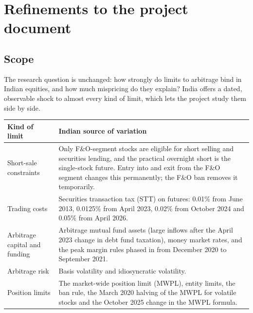 \documentclass[11pt,a4paper]{article}
\begin{document}
\section{Refinements to the project document}\label{sec:refine}
\subsection{Scope}
The research question is unchanged: how strongly do limits to arbitrage bind in Indian equities, and how much mispricing do
they explain? India offers a dated, observable shock to almost every kind of limit, which lets the project study them side by
side.

\begin{center}\small
\begin{tabularx}{\textwidth}{>{\raggedright\arraybackslash}p{3.3cm}>{\raggedright\arraybackslash}X}
\toprule
Kind of limit & Indian source of variation \\
\midrule
Short-sale constraints & Only F\&O-segment stocks are eligible for short selling and securities lending, and the practical
overnight short is the single-stock future. Entry into and exit from the F\&O segment changes this permanently; the F\&O ban
removes it temporarily. \\
Trading costs & Securities transaction tax (STT) on futures: 0.01\% from June 2013, 0.0125\% from April 2023, 0.02\% from
October 2024 and 0.05\% from April 2026. \\
Arbitrage capital and funding & Arbitrage mutual fund assets (large inflows after the April 2023 change in debt fund
taxation), money market rates, and the peak margin rules phased in from December 2020 to September 2021. \\
Arbitrage risk & Basis volatility and idiosyncratic volatility. \\
Position limits & The market-wide position limit (MWPL), entity limits, the ban rule, the March 2020 halving of the MWPL for
volatile stocks and the October 2025 change in the MWPL formula. \\
\bottomrule
\end{tabularx}
\end{center}
\end{document}
